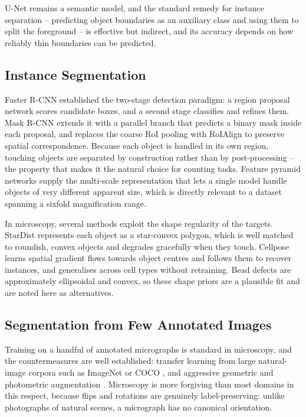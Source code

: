 U-Net remains a semantic model, and the standard remedy for instance separation --
predicting object boundaries as an auxiliary class and using them to split the
foreground -- is effective but indirect, and its accuracy depends on how reliably
thin boundaries can be predicted.

\subsection{Instance Segmentation}

Faster R-CNN \cite{ren2015faster} established the two-stage detection paradigm: a
region proposal network scores candidate boxes, and a second stage classifies and
refines them. Mask R-CNN \cite{he2017mask} extends it with a parallel branch that
predicts a binary mask inside each proposal, and replaces the coarse RoI pooling
with RoIAlign to preserve spatial correspondence. Because each object is handled in
its own region, touching objects are separated by construction rather than by
post-processing -- the property that makes it the natural choice for counting tasks.
Feature pyramid networks \cite{lin2017feature} supply the multi-scale representation
that lets a single model handle objects of very different apparent size, which is
directly relevant to a dataset spanning a sixfold magnification range.

In microscopy, several methods exploit the shape regularity of the targets.
StarDist \cite{schmidt2018stardist} represents each object as a star-convex polygon,
which is well matched to roundish, convex objects and degrades gracefully when they
touch. Cellpose \cite{stringer2021cellpose} learns spatial gradient flows towards
object centres and follows them to recover instances, and generalises across cell
types without retraining. Bead defects are approximately ellipsoidal and convex, so
these shape priors are a plausible fit and are noted here as alternatives.

\subsection{Segmentation from Few Annotated Images}

Training on a handful of annotated micrographs is standard in microscopy, and the
countermeasures are well established: transfer learning from large natural-image
corpora such as ImageNet \cite{deng2009imagenet} or COCO \cite{lin2014microsoft},
and aggressive geometric and photometric augmentation \cite{shorten2019survey}.
Microscopy is more forgiving than most domains in this respect, because flips and
rotations are genuinely label-preserving: unlike photographs of natural scenes, a
micrograph has no canonical orientation.

